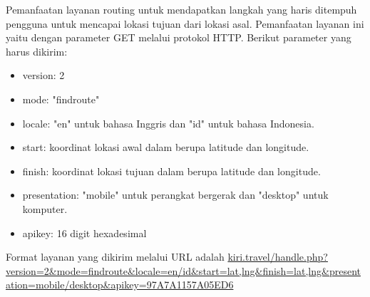 \hspace{0.5cm} Pemanfaatan layanan routing untuk mendapatkan langkah yang haris ditempuh pengguna untuk mencapai lokasi tujuan dari lokasi asal. Pemanfaatan layanan ini yaitu dengan parameter GET melalui protokol HTTP. Berikut parameter yang harus dikirim:
\begin{itemize}
	\item version: 2
	\item mode: "findroute"
	\item locale: "en" untuk bahasa Inggris dan "id" untuk bahasa Indonesia.
	\item start: koordinat lokasi awal dalam berupa latitude dan longitude.
	\item finish: koordinat lokasi tujuan dalam berupa latitude dan longitude.
	\item presentation: "mobile" untuk perangkat bergerak dan "desktop" untuk komputer.
	\item apikey: 16 digit hexadesimal
\end{itemize}

Format layanan yang dikirim melalui URL adalah \url{kiri.travel/handle.php?version=2&mode=findroute&locale=en/id&start=lat,lng&finish=lat,lng&presentation=mobile/desktop&apikey=97A7A1157A05ED6}


